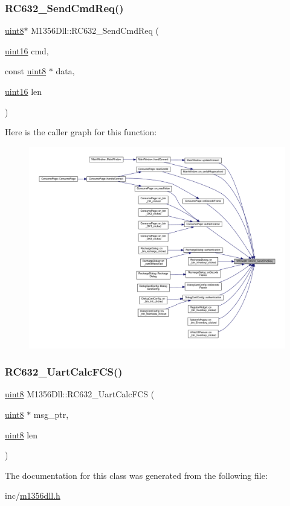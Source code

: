\subsubsection{\texorpdfstring{RC632\_SendCmdReq()}{RC632\_SendCmdReq()}}
{\footnotesize\ttfamily \mbox{\hyperlink{m1356dll_8h_adde6aaee8457bee49c2a92621fe22b79}{uint8}}$\ast$ M1356\+Dll\+::\+R\+C632\+\_\+\+Send\+Cmd\+Req (\begin{DoxyParamCaption}\item[{\mbox{\hyperlink{m1356dll_8h_a05f6b0ae8f6a6e135b0e290c25fe0e4e}{uint16}}}]{cmd,  }\item[{const \mbox{\hyperlink{m1356dll_8h_adde6aaee8457bee49c2a92621fe22b79}{uint8}} $\ast$}]{data,  }\item[{\mbox{\hyperlink{m1356dll_8h_a05f6b0ae8f6a6e135b0e290c25fe0e4e}{uint16}}}]{len }\end{DoxyParamCaption})}

Here is the caller graph for this function\+:
\nopagebreak
\begin{figure}[H]
\begin{center}
\leavevmode
\includegraphics[width=350pt]{class_m1356_dll_ab86ae59233d587f4688470796cbb85b1_icgraph}
\end{center}
\end{figure}
\mbox{\label{class_m1356_dll_a048d48e3154a48258d25391b19de938c}} 
\subsubsection{\texorpdfstring{RC632\_UartCalcFCS()}{RC632\_UartCalcFCS()}}
{\footnotesize\ttfamily \mbox{\hyperlink{m1356dll_8h_adde6aaee8457bee49c2a92621fe22b79}{uint8}} M1356\+Dll\+::\+R\+C632\+\_\+\+Uart\+Calc\+F\+CS (\begin{DoxyParamCaption}\item[{\mbox{\hyperlink{m1356dll_8h_adde6aaee8457bee49c2a92621fe22b79}{uint8}} $\ast$}]{msg\+\_\+ptr,  }\item[{\mbox{\hyperlink{m1356dll_8h_adde6aaee8457bee49c2a92621fe22b79}{uint8}}}]{len }\end{DoxyParamCaption})}



The documentation for this class was generated from the following file\+:\begin{DoxyCompactItemize}
\item 
inc/\mbox{\hyperlink{m1356dll_8h}{m1356dll.\+h}}\end{DoxyCompactItemize}
